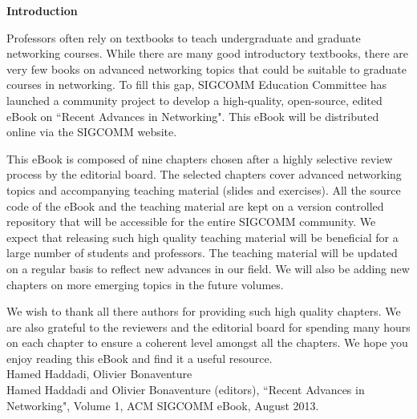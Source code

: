 \pagestyle{empty}

{\Huge \textbf{Introduction}}

\vspace{1in}


Professors often rely on textbooks to teach undergraduate and graduate networking courses. While there are many good introductory textbooks, there are very few books on advanced networking topics that could be suitable to graduate courses in networking. To fill this gap, SIGCOMM Education Committee has launched a community project to develop a high-quality, open-source, edited eBook on ``Recent Advances in Networking". This eBook will be distributed online via the SIGCOMM website. 

This eBook is composed of nine chapters chosen after a highly selective review process by the editorial board. The selected chapters cover advanced networking topics and accompanying teaching material (slides and exercises). All the source code of the eBook and the teaching material are kept on a version controlled repository that will be accessible for the entire SIGCOMM community. We expect that releasing such high quality teaching material will be beneficial for a large number of students and professors. The teaching material will be updated on a regular basis to reflect new advances in our field. We will also be adding new chapters on more emerging topics in the future volumes.


We wish to thank all there authors for providing such high quality chapters. We are also grateful to the reviewers and the editorial board for spending many hours on each chapter to ensure a coherent level amongst all the chapters. We hope you enjoy reading this eBook and find it a useful resource.\\


Hamed Haddadi, Olivier Bonaventure \\ 


\vspace{1in}
Hamed Haddadi and Olivier Bonaventure (editors), ``Recent Advances in Networking", Volume 1, ACM SIGCOMM eBook, August 2013. 